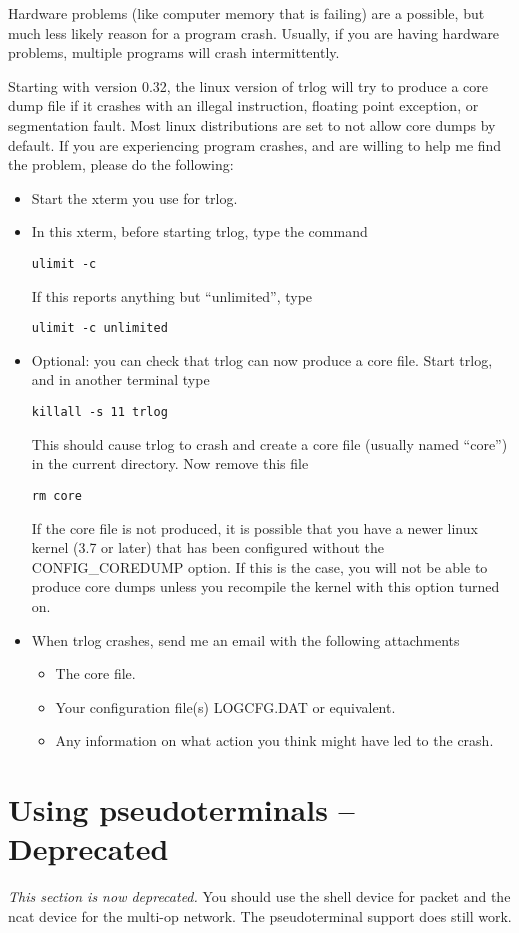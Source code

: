 \documentclass[12pt]{article}
\begin{document}
Hardware problems (like computer memory that is failing) are a possible,
but much
less likely reason for a program crash.
Usually, if you are having hardware problems,
multiple programs will crash intermittently.

Starting with version 0.32, the linux version of trlog will try to produce
a core dump file
if it crashes with an illegal instruction, floating
point exception, or segmentation fault. Most linux distributions are
set to not allow core dumps by default. If you are experiencing program
crashes, and are willing to help me find the problem, please do the following:
\begin{itemize}
\item
Start the xterm you use for trlog.
\item
In this xterm, before starting trlog, type the command
\begin{verbatim}
ulimit -c
\end{verbatim}
If this reports anything but ``unlimited'', type
\begin{verbatim}
ulimit -c unlimited
\end{verbatim}
\item
Optional:
you
can check that trlog can now produce a core file. Start trlog, and in
another terminal type
\begin{verbatim}
killall -s 11 trlog
\end{verbatim}
This should cause trlog to crash and create a core file (usually named
``core'') in the current directory.
Now remove this file
\begin{verbatim}
rm core
\end{verbatim}
If the core file is not produced, it is possible that you have a newer
linux kernel (3.7 or later) that has been configured without the
CONFIG\_COREDUMP option. If this is the case, you will not be able to
produce core dumps unless you recompile the kernel with this option turned
on.
\item
When trlog crashes, send me an email with the following attachments
\begin{itemize}
\item
The core file.
\item
Your configuration file(s) LOGCFG.DAT or equivalent.
\item
Any information on what action you think might have led to the crash.
\end{itemize}
\end{itemize}

\section{Using pseudoterminals -- Deprecated}
{\em This section is now deprecated.} You should use the shell device
for packet and the ncat device for the multi-op network. The pseudoterminal
support does still work.
\end{document}
